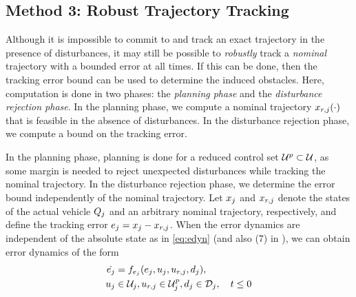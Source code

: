 \subsection{Method 3: Robust Trajectory Tracking\label{sec:rtt}}
Although it is impossible to commit to and track an exact trajectory in the presence of disturbances, it may still be possible to \textit{robustly} track a \textit{nominal} trajectory with a bounded error at all times. If this can be done, then the tracking error bound can be used to determine the induced obstacles. Here, computation is done in two phases: the \textit{planning phase} and the \textit{disturbance rejection phase}. In the planning phase, we compute a nominal trajectory $x_{r,j}(\cdot)$ that is feasible in the absence of disturbances. In the disturbance rejection phase, we compute a bound on the tracking error.%

In the planning phase, planning is done for a reduced control set $\mathcal{U}^p\subset\mathcal{U}$, as some margin is needed to reject unexpected disturbances while tracking the nominal trajectory. In the disturbance rejection phase, we determine the error bound independently of the nominal trajectory. Let $x_j$ and $x_{r,j}$ denote the states of the actual vehicle $Q_j$ and an arbitrary nominal trajectory, respectively, and define the tracking error $e_j=x_j-x_{r,j}$. When the error dynamics are independent of the absolute state as in \eqref{eq:edyn} (and also (7) in \cite{Mitchell05}), we can obtain error dynamics of the form
\begin{equation}
\label{eq:edyn} %
\begin{aligned}
\dot{e_j} &= \fdyn_{e_j}(e_j, \ctrl_j, \ctrl_{r,j},\dstb_j), \\
\ctrl_j &\in \cset_j, \ctrl_{r,j} \in \cset^p_j, \dstb_j \in \dset_j, \quad t \leq 0
\end{aligned}
\end{equation}

